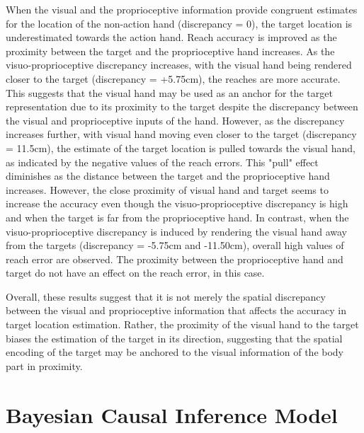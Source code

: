 When the visual and the proprioceptive information provide congruent estimates for the location of the non-action hand (discrepancy = 0), the target location is underestimated towards the action hand. Reach accuracy is improved as the proximity between the target and the proprioceptive hand increases. As the visuo-proprioceptive discrepancy increases, with the visual hand being rendered closer to the target (discrepancy = +5.75cm), the reaches are more accurate. This suggests that the visual hand may be used as an anchor for the target representation due to its proximity to the target despite the discrepancy between the visual and proprioceptive inputs of the hand. However, as the discrepancy increases further, with visual hand moving even closer to the target (discrepancy = 11.5cm), the estimate of the target location is pulled towards the visual hand, as indicated by the negative values of the reach errors. This "pull" effect diminishes as the distance between the target and the proprioceptive hand increases. However, the close proximity of visual hand and target seems to increase the accuracy even though the visuo-proprioceptive discrepancy is high and when the target is far from the proprioceptive hand. In contrast, when the visuo-proprioceptive discrepancy is induced by rendering the visual hand away from the targets (discrepancy = -5.75cm and -11.50cm), overall high values of reach error are observed. The proximity between the proprioceptive hand and target do not have an effect on the reach error, in this case.

Overall, these results suggest that it is not merely the spatial discrepancy between the visual and proprioceptive information that affects the accuracy in target location estimation. Rather, the proximity of the visual hand to the target biases the estimation of the target in its direction, suggesting that the spatial encoding of the target may be anchored to the visual information of the body part in proximity.  



 
\section{Bayesian Causal Inference Model}


